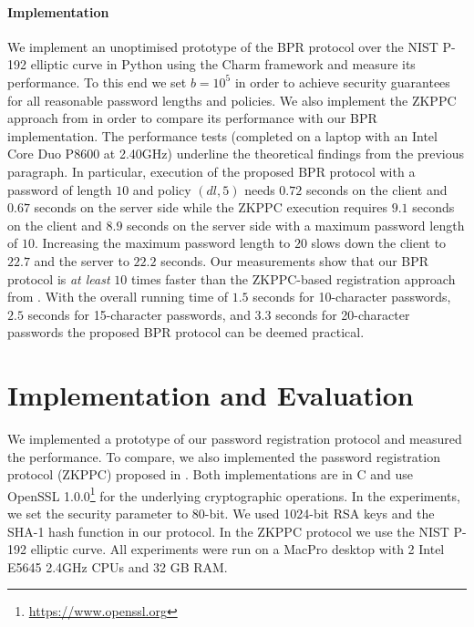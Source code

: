 \paragraph{Implementation}
We implement an unoptimised prototype of the BPR protocol over the NIST P-192 elliptic curve \cite{nistEC} in Python using the Charm framework \cite{charm13} and measure its performance.
To this end we set $b=10^5$ in order to achieve security guarantees for all reasonable password lengths and policies.
We also implement the ZKPPC approach from \cite{KieferM14} in order to compare its performance with our BPR implementation.
The performance tests (completed on a laptop with an Intel Core Duo P8600 at 2.40GHz) underline the theoretical findings from the previous paragraph. In particular, execution of the proposed BPR protocol with a password of length $10$ and policy $(dl, 5)$ needs $0.72$ seconds on the client and $0.67$ seconds on the server side while the ZKPPC execution requires $9.1$ seconds on the client and $8.9$ seconds on the server side with a maximum password length of $10$.
Increasing the maximum password length to $20$ slows down the client to $22.7$ and the server to $22.2$ seconds.
Our measurements show that our BPR protocol is \emph{at least} $10$ times faster than the ZKPPC-based registration approach from \cite{KieferM14}.
With the overall running time of $1.5$ seconds for 10-character passwords, $2.5$ seconds for 15-character passwords, and $3.3$ seconds for 20-character passwords the proposed BPR protocol can be deemed practical.

\section{Implementation and Evaluation}\label{sec:evaluation}
We implemented a prototype of our password registration protocol and measured the performance. 
To compare, we also implemented the password registration protocol (ZKPPC) proposed in \cite{KieferM14c}. 
Both implementations are in C and use OpenSSL 1.0.0\footnote{\url{https://www.openssl.org}} for the underlying cryptographic operations. 
In the experiments, we set the security parameter to 80-bit. We used 1024-bit RSA keys and the \mbox{{SHA-}1} hash function in our protocol. 
In the ZKPPC protocol we use the NIST P-192 elliptic curve. 
All experiments were run on a MacPro desktop with 2 Intel E5645 2.4GHz CPUs and 32 GB RAM.

